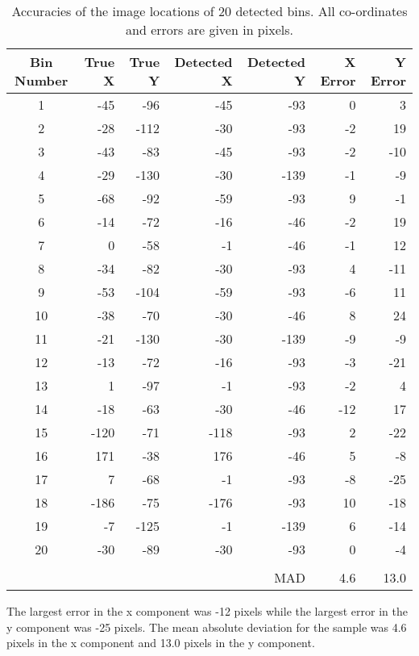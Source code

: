 \begin{table}[H]
\caption[Localisation Results]{Accuracies of the image locations of 20 detected bins. All co-ordinates and errors are given in pixels.}
\label{tab:localisation_results}
\centering
\begin{tabular}{c r r r r r r}
\toprule
\textbf{Bin Number} & \textbf{True X} & \textbf{True Y} & \textbf{Detected X} & \textbf{Detected Y} & \textbf{X Error} & \textbf{Y Error} \\
\midrule
1 & -45 & -96 & -45 & -93 & 0 & 3 \\
2 & -28 & -112 & -30 & -93 & -2 & 19 \\
3 & -43 & -83 & -45 & -93 & -2 & -10 \\
4 & -29 & -130 & -30 & -139 & -1 & -9 \\
5 & -68 & -92 & -59 & -93 & 9 & -1 \\
6 & -14 & -72 & -16 & -46 & -2 & 19 \\
7 & 0 & -58 & -1 & -46 & -1 & 12 \\
8 & -34 & -82 & -30 & -93 & 4 & -11 \\
9 & -53 & -104 & -59 & -93 & -6 & 11 \\
10 & -38 & -70 & -30 & -46 & 8 & 24 \\
11 & -21 & -130 & -30 & -139 & -9 & -9 \\
12 & -13 & -72 & -16 & -93 & -3 & -21 \\
13 & 1 & -97 & -1 & -93 & -2 & 4 \\
14 & -18 & -63 & -30 & -46 & -12 & 17 \\
15 & -120 & -71 & -118 & -93 & 2 & -22 \\
16 & 171 & -38 & 176 & -46 & 5 & -8 \\
17 & 7 & -68 & -1 & -93 & -8 & -25 \\
18 & -186 & -75 & -176 & -93 & 10 & -18 \\
19 & -7 & -125 & -1 & -139 & 6 & -14 \\
20 & -30 & -89 & -30 & -93 & 0 & -4 \\
\bottomrule\\
& & & & MAD & 4.6 & 13.0 \\
\end{tabular}
\end{table}

The largest error in the x component was -12 pixels while the largest error in the y component was -25 pixels. The mean absolute deviation for the sample was 4.6 pixels in the x component and 13.0 pixels in the y component.

